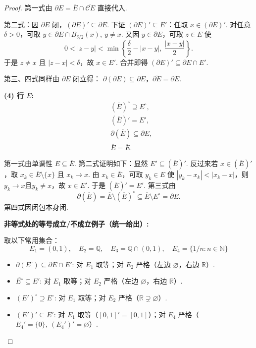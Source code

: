 \begin{3b}
\begin{enumerate}
\begin{proof}
第一式由 $\partial E=\overline{E}\cap\overline{\mathscr{C}E}$ 直接代入.

第二式：因 $\partial E$ 闭，$(\partial E)'\subseteq\partial E$.
下证 $(\partial E)'\subseteq E'$：任取 $x\in(\partial E)'$.
对任意 $\delta>0$，可取 $y\in\partial E\cap B_{\delta/2}(x),\ y\ne x$.
又因 $y\in\partial E$，可取 $z\in E$ 使
\[
0<|z-y|<\min\left\{\frac{\delta}{2}-|x-y|,\ \frac{|x-y|}{2}\right\}.
\]
于是 $z\ne x$ 且 $|z-x|<\delta$，故 $x\in E'$.
合并即得 $(\partial E)'\subseteq\partial E\cap E'$.

第三、四式同样由 $\partial E$ 闭立得：
$\partial(\partial E)\subseteq\partial E$，$\overline{\partial E}=\partial E$.

\textbf{(4) 行 $\overline{E}$:}
\begin{align*}
& (\overline{E})^\circ\supseteq E^\circ,\\
& (\overline{E})'=E',\\
& \partial(\overline{E})\subseteq\partial E,\\
& \overline{\overline{E}}=\overline{E}.
\end{align*}

第一式由单调性 $E\subseteq\overline{E}$.
第二式证明如下：显然 $E'\subseteq(\overline{E})'$.
反过来若 $x\in(\overline{E})'$，取 $x_k\in\overline{E}\setminus\{x\}$ 且 $x_k\to x$.
由 $x_k\in\overline{E}$，可取 $y_k\in E$ 使 $|y_k-x_k|<|x_k-x|$，则 $y_k\to x$且$y_k\neq x$，故 $x\in E'$.
于是 $(\overline{E})'=E'$.
第三式由
\[
\partial(\overline{E})=\overline{E}\setminus(\overline{E})^\circ
\subseteq \overline{E}\setminus E^\circ
=\partial E.
\]
第四式因闭包本身闭.

\textbf{非等式处的等号成立/不成立例子（统一给出）:}

取以下常用集合：
\[
E_1=(0,1),\quad E_2=\mathbb{Q},\quad E_3=\mathbb{Q}\cap(0,1),\quad E_4=\{1/n:n\in\mathbb{N}\}
\]

\begin{itemize}
\item $\partial(E^\circ)\subseteq\partial E\cap E'$:
对 $E_1$ 取等；对 $E_2$ 严格（左边 $\varnothing$，右边 $\mathbb{R}$）.

\item $\overline{E^\circ}\subseteq E'$:
对 $E_1$ 取等；对 $E_2$ 严格（左边 $\varnothing$，右边 $\mathbb{R}$）.

\item $(E')^\circ\supseteq E^\circ$:
对 $E_1$ 取等；对 $E_2$ 严格（$\mathbb{R}\supsetneq\varnothing$）.

\item $(E')'\subseteq E'$:
对 $E_1$ 取等（$[0,1]'=[0,1]$）；对 $E_4$ 严格（$E_4'=\{0\},\ (E_4')'=\varnothing$）.


\end{itemize}
\end{proof}
\end{enumerate}
\end{3b}
